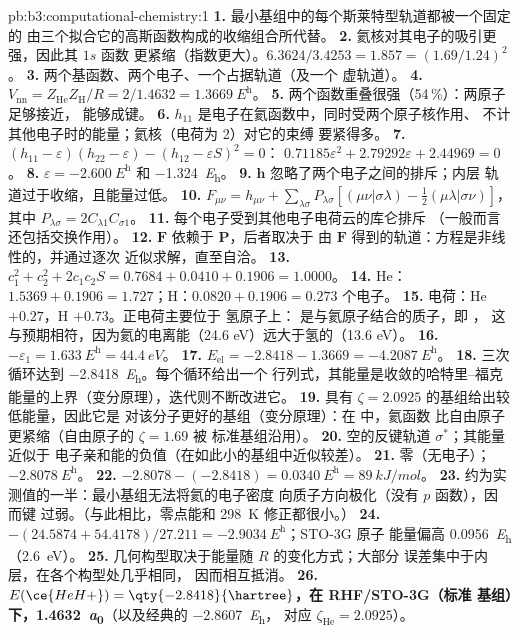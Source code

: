 \begin{solution}{pb:b3:computational-chemistry:1}
\textbf{1.} 最小基组中的每个斯莱特型轨道都被一个固定的
由三个拟合它的高斯函数构成的收缩组合所代替。
\textbf{2.} 氦核对其电子的吸引更强，因此其 $1s$ 函数
更紧缩（指数更大）。$6.3624/3.4253 = 1.857 = (1.69/1.24)^2$。
\textbf{3.} 两个基函数、两个电子、一个占据轨道（及一个
虚轨道）。
\textbf{4.} $V_{\mathrm{nn}} = Z_{\mathrm{He}}Z_{\mathrm H}/R = 2/1.4632 =
\qty{1.3669}{\hartree}$。
\textbf{5.} 两个函数重叠很强（54\,\%）：两原子足够接近，
能够成键。
\textbf{6.} $h_{11}$ 是电子在氦函数中，同时受两个原子核作用、
不计其他电子时的能量；氦核（电荷为 2）对它的束缚
要紧得多。
\textbf{7.} $(h_{11} - \varepsilon)(h_{22} - \varepsilon) - (h_{12} - \varepsilon S)^2 = 0$：
$0.71185\varepsilon^2 + 2.79292\varepsilon + 2.44969 = 0$。
\textbf{8.} $\varepsilon = \qty{-2.600}{\hartree}$ 和 \qty{-1.324}{\hartree}。
\textbf{9.} $\mathbf h$ 忽略了两个电子之间的排斥；内层
轨道过于收缩，且能量过低。
\textbf{10.} $F_{\mu\nu} = h_{\mu\nu} + \sum_{\lambda\sigma}P_{\lambda\sigma}[(\mu\nu|\sigma\lambda) -
\frac12(\mu\lambda|\sigma\nu)]$，其中 $P_{\lambda\sigma} = 2C_{\lambda1}C_{\sigma1}$。
\textbf{11.} 每个电子受到其他电子电荷云的库仑排斥
（一般而言还包括交换作用）。
\textbf{12.} $\mathbf F$ 依赖于 $\mathbf P$，后者取决于
由 $\mathbf F$ 得到的轨道：方程是非线性的，并通过逐次
近似求解，直至自洽。
\textbf{13.} $c_1^2 + c_2^2 + 2c_1c_2S = 0.7684 + 0.0410 + 0.1906 = 1.0000$。
\textbf{14.} He：$1.5369 + 0.1906 = 1.727$；H：$0.0820 + 0.1906 = 0.273$
个电子。
\textbf{15.} 电荷：He $+0.27$，H $+0.73$。正电荷主要位于
氢原子上： 是与氦原子结合的质子，即 ，
这与预期相符，因为氦的电离能（24.6 eV）远大于氢的（13.6 eV）。
\textbf{16.} $-\varepsilon_1 = \qty{1.633}{\hartree} = \qty{44.4}{eV}$。
\textbf{17.} $E_{\mathrm{el}} = -2.8418 - 1.3669 = \qty{-4.2087}{\hartree}$。
\textbf{18.} 三次循环达到 \qty{-2.8418}{\hartree}。每个循环给出一个
行列式，其能量是收敛的哈特里–福克
能量的上界（变分原理），迭代则不断改进它。
\textbf{19.} 具有 $\zeta = 2.0925$ 的基组给出较低能量，因此它是
对该分子更好的基组（变分原理）：在  中，氦函数
比自由原子更紧缩（自由原子的 $\zeta = 1.69$ 被
标准基组沿用）。
\textbf{20.} 空的反键轨道 $\sigma^*$；其能量近似于
 电子亲和能的负值（在如此小的基组中近似较差）。
\textbf{21.} 零（无电子）；$\qty{-2.8078}{\hartree}$。
\textbf{22.} $-2.8078 - (-2.8418) = \qty{0.0340}{\hartree} = \qty{89}{kJ/mol}$。
\textbf{23.} 约为实测值的一半：最小基组无法将氦的电子密度
向质子方向极化（没有 $p$ 函数），因而键
过弱。（与此相比，零点能和 \qty{298}{K} 修正都很小。）
\textbf{24.} $-(24.5874 + 54.4178)/27.211 = \qty{-2.9034}{\hartree}$；STO-3G 原子
能量偏高 \qty{0.0956}{\hartree}（\qty{2.6}{eV}）。
\textbf{25.} 几何构型取决于能量随 $R$ 的变化方式；大部分
误差集中于内层，在各个构型处几乎相同，
因而相互抵消。
\textbf{26.} \textbf{$E(\ce{HeH+}) = \qty{-2.8418}{\hartree}$，在 RHF/STO-3G（标准
基组）下，\qty{1.4632}{\bohr}}（以及经典的 \qty{-2.8607}{\hartree}，
对应 $\zeta_{\mathrm{He}} = 2.0925$）。
\end{solution}
